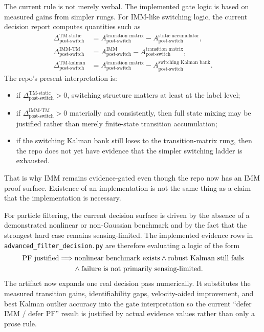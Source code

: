 \documentclass[11pt]{article}
\begin{document}
The current rule is not merely verbal. The implemented gate logic is based on
measured gains from simpler rungs. For IMM-like switching logic, the current
decision report computes quantities such as
\begin{align}
    \Delta_{\text{post-switch}}^{\text{TM-static}}
    &= A_{\text{post-switch}}^{\text{transition matrix}}
    - A_{\text{post-switch}}^{\text{static accumulator}}, \\
    \Delta_{\text{post-switch}}^{\text{IMM-TM}}
    &= A_{\text{post-switch}}^{\text{IMM}}
    - A_{\text{post-switch}}^{\text{transition matrix}}, \\
    \Delta_{\text{post-switch}}^{\text{TM-kalman}}
    &= A_{\text{post-switch}}^{\text{transition matrix}}
    - A_{\text{post-switch}}^{\text{switching Kalman bank}}.
\end{align}
The repo's present interpretation is:
\begin{itemize}[leftmargin=1.5em]
    \item if \(\Delta_{\text{post-switch}}^{\text{TM-static}} > 0\), switching
    structure matters at least at the label level;
    \item if \(\Delta_{\text{post-switch}}^{\text{IMM-TM}} > 0\) materially and
    consistently, then full state mixing may be justified rather than merely
    finite-state transition accumulation;
    \item if the switching Kalman bank still loses to the transition-matrix
    rung, then the repo does not yet have evidence that the simpler switching
    ladder is exhausted.
\end{itemize}
That is why IMM remains evidence-gated even though the repo now has an IMM
proof surface. Existence of an implementation is not the same thing as a claim
that the implementation is necessary.

For particle filtering, the current decision surface is driven by the absence of
a demonstrated nonlinear or non-Gaussian benchmark and by the fact that the
strongest hard case remains sensing-limited. The implemented evidence rows in
\texttt{advanced\_filter\_decision.py} are therefore evaluating a logic of the
form
\begin{align}
    \text{PF justified}
    &\Longrightarrow
    \text{nonlinear benchmark exists}
    \land
    \text{robust Kalman still fails}
    \notag \\
    &\qquad \land
    \text{failure is not primarily sensing-limited}.
\end{align}
The artifact
now expands one real decision pass numerically. It substitutes the measured
transition gains, identifiability gaps, velocity-aided improvement, and best
Kalman outlier accuracy into the gate interpretation so the current
``defer IMM / defer PF'' result is justified by actual evidence values rather
than only a prose rule.
\end{document}
